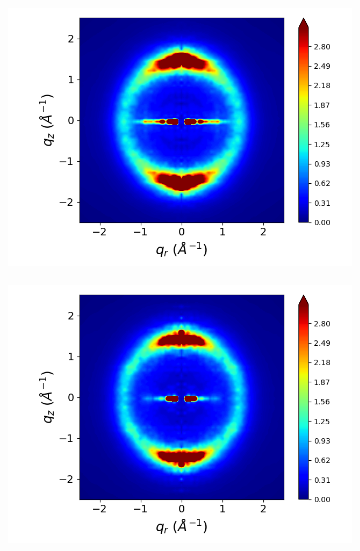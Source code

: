 \documentclass[journal=jpcbfk,manuscript=article]{achemso}
\begin{document}
\begin{figure}[!htb]
  \begin{subfigure}{0.3\linewidth}
  	\centering
  	\includegraphics[width=\textwidth]{staggered_rzplot_norestraints.png} %
  	\caption{}\label{fig:staggered_rzplot_norestraints} 
  \end{subfigure}
  \begin{subfigure}{0.3\linewidth}
  	\centering
  	\includegraphics[width=\textwidth]{rotated_monomers_rzplot_norestraints.png}
  	\caption{}\label{fig:rotated_monomers_rzplot_norestraints}

\end{subfigure}
\end{figure}
\end{document}
